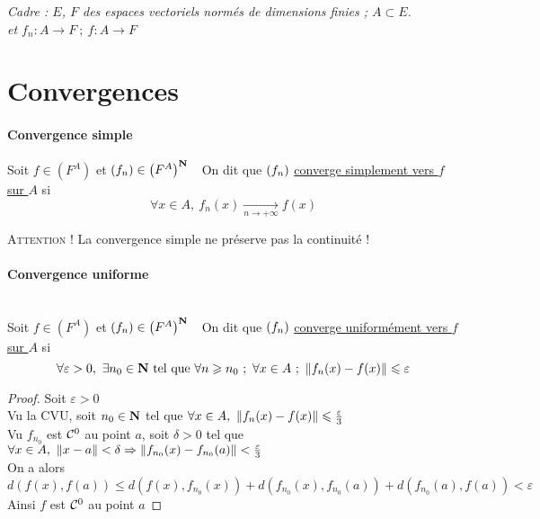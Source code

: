 

\textit{Cadre : $E$, $F$ des espaces vectoriels normés de dimensions finies ; $A\subset E$.} \\

\textit{ et $f_n : A\longrightarrow F ~;~f : A\longrightarrow F$}
\minitoc
\section{Convergences}

    \traitd
    \paragraph{Convergence simple}
        Soit $f\in \left( F^A \right)$ et $(f_n) \in \left( F^A \right)^{{\mathbf{N}}}~~$  On dit que $(f_n)$ \underline{converge simplement vers 
        $f$ sur $A$} si 
        \[ 
            \forall x\in A , ~ f_n(x) \underset{n\rightarrow +\infty}{\longrightarrow} f(x)
        \] 
    \trait

    {\small \textsc{Attention !} La convergence simple ne préserve pas la continuité !} 
    
    \traitd
    \paragraph{Convergence uniforme} ~\\
        Soit $f\in \left( F^A \right)$ et $(f_n) \in \left( F^A \right)^{{\mathbf{N}}}~~$  On dit que $(f_n)$ \underline{converge uniformément 
        vers $f$ sur $A$} si 
        \[ 
            \forall \varepsilon >0 ,~\exists n_0 \in{\mathbf{N}} ~\mathrm{tel} ~\mathrm{que} ~\forall n\geqslant n_0 ~;~ \forall x\in A~;~ \left\Vert f_n(x) - f(x)  \right\Vert \leqslant \varepsilon 
        \]	 
    \trait	

     \medskip

    
    \begin{proof}
        Soit $\varepsilon >0$ \\ Vu la CVU, soit $n_0\in{\mathbf{N}}$ tel que $\forall x\in A ,~\left\Vert f_n(x)-f(x) \right\Vert \leqslant \frac{\varepsilon}{3}$\\
        Vu $f_{n_0}$ est ${\mathcal{C}}^0$ au point $a$, soit $\delta >0$ tel que $\forall x\in A,~\left\Vert x-a \right\Vert <\delta \Rightarrow \left\Vert f_{n_0}(x) - 
        f_{n_0}(a) \right\Vert <\frac{\varepsilon}{3}$ \\ On a alors $d(f(x),f(a)) \leqslant d(f(x),f_{n_0}(x)) + d(f_{n_0}(x),f_{n_0}(a)) + 
        d(f_{n_0}(a) , f(a)) <\varepsilon$ \\ Ainsi $f$ est ${\mathcal{C}}^0$ au point $a$
    \end{proof} \medskip

